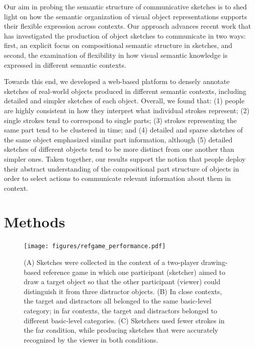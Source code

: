 \documentclass[10pt,letterpaper]{article}
\begin{document}
Our aim in probing the semantic structure of communicative sketches is to shed light on how the semantic organization of visual object representations supports their flexible expression across contexts. 
Our approach advances recent work \cite{FanCommon2018} that has investigated the production of object sketches to communicate in two ways: first, an explicit focus on compositional semantic structure in sketches, and second, the examination of flexibility in how visual semantic knowledge is expressed in different semantic contexts. 

Towards this end, we developed a web-based platform to densely annotate sketches of real-world objects produced in different semantic contexts, including detailed and simpler sketches of each object. 
Overall, we found that: (1) people are highly consistent in how they interpret what individual strokes represent; (2) single strokes tend to correspond to single parts; (3) strokes representing the same part tend to be clustered in time; and (4) detailed and sparse sketches of the same object emphasized similar part information, although (5) detailed sketches of different objects tend to be more distinct from one another than simpler ones. 
Taken together, our results support the notion that people deploy their abstract understanding of the compositional part structure of objects in order to select actions to communicate relevant information about them in context. 

\section{Methods}

\begin{figure}[htbp]
\centering
\texttt{[image: figures/refgame\_performance.pdf]}
\caption{(A) Sketches were collected in the context of a two-player drawing-based reference game in which one participant (sketcher) aimed to draw a target object so that the other participant (viewer) could distinguish it from three distractor objects. (B) In close contexts, the target and distractors all belonged to the same basic-level category; in far contexts, the target and distractors belonged to different basic-level categories. (C) Sketchers used fewer strokes in the far condition, while producing sketches that were accurately recognized by the viewer in both conditions.}
\label{refgame_performance}
\end{figure}
\end{document}
